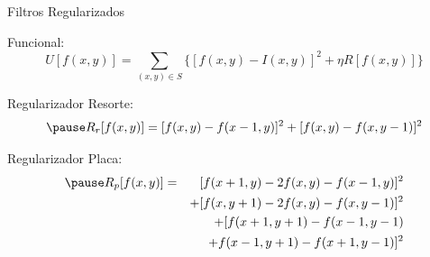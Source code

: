 \documentclass[]{beamer}
\begin{document}
\begin{frame}{Filtros Regularizados}

Funcional:
\begin{equation}
  U[f(x,y)]= \sum_{(x,y) \in S} \Big\{  [ f(x,y)-I(x,y) ]^2 + \eta R[f(x,y)] \Big\} 
\end{equation}

Regularizador Resorte:
\begin{equation}
  \pause R_r [f(x,y)] = [f(x,y)-f(x-1,y)]^2 + [f(x,y)-f(x,y-1)]^2 
\end{equation}

Regularizador Placa:
\begin{eqnarray}
  \pause R_p [f(x,y)] & = & [f(x+1,y)-2f(x,y)-f(x-1,y)]^2 \nonumber \\
  & & + [f(x,y+1)-2f(x,y)-f(x,y-1)]^2 \nonumber \\
  & & + [ f(x+1,y+1)-f(x-1,y-1) \nonumber \\ 
  & & + f(x-1,y+1)-f(x+1,y-1) ]^2
\end{eqnarray}

\end{frame}
\end{document}
